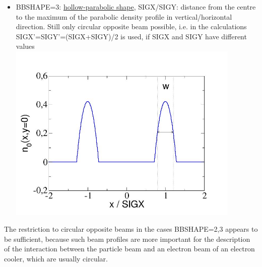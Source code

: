 \begin{itemize}
\begin{itemize}
\\
        \item  BBSHAPE=3: \href{beambeam_n_hollowparabol.jpg}{hollow-parabolic shape}, 
          SIGX/SIGY: distance from the centre 
          to the maximum of the parabolic density profile in vertical/horizontal 
          direction. Still only circular opposite beam possible, 
          i.e. in the calculations 
          SIGX'=SIGY'=(SIGX+SIGY)/2 is used, if SIGX and SIGY have different values 
\\
\includegraphics[width=420px]{Introduction/beambeam_n_hollowparabol.jpg}
\\
     \end{itemize}
     
     The restriction to circular opposite beams in the cases BBSHAPE=2,3 
     appears to be sufficient, because such beam profiles are more important 
     for the description of the interaction between the particle beam and 
     an electron beam of an electron cooler, which are usually circular. 
     

\end{itemize}
